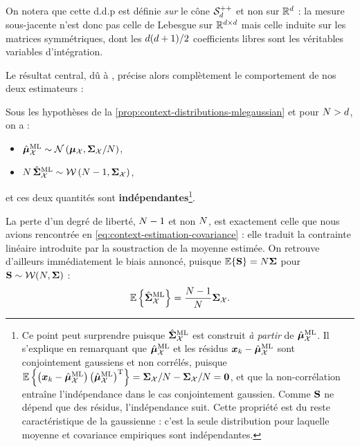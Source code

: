 \begin{remark}
  On notera que cette d.d.p est définie \emph{sur} le cône $\mathcal{S}_{d}^{++}$ et non sur $\mathbb{R}^d$ : la mesure sous-jacente n'est donc pas celle de Lebesgue sur $\mathbb{R}^{d\times d}$ mais celle induite sur les matrices symmétriques, dont les $d(d+1)/2$ coefficients libres sont les véritables variables d'intégration.
\end{remark}

Le résultat central, dû à , précise alors complètement le comportement de nos deux estimateurs :

\begin{proposition}
\label{prop:context-distributions-wishartscm}
  Sous les hypothèses de la \cref{prop:context-distributions-mlegaussian} et pour $N>d$, on a :
  \begin{itemize}
    \item $\hat{\boldsymbol{\mu}}_{\mathcal{X}}^{\mathrm{ML}} \sim \mathcal{N}\left(\boldsymbol{\mu}_{\mathcal{X}}, \boldsymbol{\Sigma}_{\mathcal{X}}/N\right)$,
    \item $N\,\hat{\boldsymbol{\Sigma}}_{\mathcal{X}}^{\mathrm{ML}} \sim \mathcal{W}\left(N-1, \boldsymbol{\Sigma}_{\mathcal{X}}\right)$,
  \end{itemize}
  et ces deux quantités sont \textbf{indépendantes}\footnote{Ce point peut surprendre puisque $\hat{\boldsymbol{\Sigma}}_{\mathcal{X}}^{\mathrm{ML}}$ est construit \emph{à partir} de $\hat{\boldsymbol{\mu}}_{\mathcal{X}}^{\mathrm{ML}}$. Il s'explique en remarquant que $\hat{\boldsymbol{\mu}}_{\mathcal{X}}^{\mathrm{ML}}$ et les résidus $\boldsymbol{x}_k-\hat{\boldsymbol{\mu}}_{\mathcal{X}}^{\mathrm{ML}}$ sont conjointement gaussiens et non corrélés, puisque $\operatorname{\mathbb{E}}\left\{\left(\boldsymbol{x}_k-\hat{\boldsymbol{\mu}}_{\mathcal{X}}^{\mathrm{ML}}\right)\left(\hat{\boldsymbol{\mu}}_{\mathcal{X}}^{\mathrm{ML}}\right)^{\mathrm{T}}\right\}=\boldsymbol{\Sigma}_{\mathcal{X}}/N - \boldsymbol{\Sigma}_{\mathcal{X}}/N = \boldsymbol{0}$, et que la non-corrélation entraîne l'indépendance dans le cas conjointement gaussien. Comme $\mathbf{S}$ ne dépend que des résidus, l'indépendance suit. Cette propriété est du reste caractéristique de la gaussienne : c'est la seule distribution pour laquelle moyenne et covariance empiriques sont indépendantes.}.
\end{proposition}

\begin{remark}
  La perte d'un degré de liberté, $N-1$ et non $N$, est exactement celle que nous avions rencontrée en \cref{eq:context-estimation-covariance} : elle traduit la contrainte linéaire introduite par la soustraction de la moyenne estimée. On retrouve d'ailleurs immédiatement le biais annoncé, puisque $\operatorname{\mathbb{E}}\{\mathbf{S}\}=N\boldsymbol{\Sigma}$ pour $\mathbf{S}\sim\mathcal{W}(N,\boldsymbol{\Sigma})$ :
  $$
  \operatorname{\mathbb{E}}\left\{\hat{\boldsymbol{\Sigma}}_{\mathcal{X}}^{\mathrm{ML}}\right\}
  =
  \frac{N-1}{N}\boldsymbol{\Sigma}_{\mathcal{X}}.
  $$
\end{remark}

